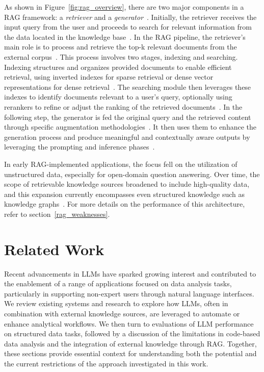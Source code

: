 \documentclass{DESSThesis}
\begin{document}
As shown in Figure~\ref{fig:rag_overview}, there are two major components in a RAG framework: a \emph{retriever} and a \emph{generator}~\cite{naveed2024comprehensiveoverviewlargelanguage,Yu_2025,zhao2024retrievalaugmentedgenerationaigeneratedcontent}. Initially, the retriever receives the input query from the user and proceeds to search for relevant information from the data located in the knowledge base~\cite{zhao2024retrievalaugmentedgenerationaigeneratedcontent}. In the RAG pipeline, the retriever's main role is to process and retrieve the top-k relevant
documents from the external corpus~\cite{gao2024retrievalaugmentedgenerationlargelanguage}. This process involves two stages, indexing and searching. Indexing structures and organizes provided documents to enable efficient retrieval, using inverted indexes for sparse retrieval or dense vector representations for dense retrieval~\cite{Yu_2025}. The searching module then leverages these indexes to identify documents relevant to a user's query, optionally using rerankers to refine or adjust the ranking of the retrieved documents~\cite{Yu_2025}. In the following step, the generator is fed the original query and the retrieved content through specific augmentation methodologies~\cite{zhao2024retrievalaugmentedgenerationaigeneratedcontent}. It then uses them to enhance the generation process and produce meaningful and contextually aware outputs by leveraging the prompting and inference phases~\cite{Yu_2025}.

In early RAG-implemented applications, the focus fell on the utilization of unstructured data, especially for open-domain question answering. Over time, the scope of retrievable knowledge sources broadened to include high-quality data, and this expansion currently encompasses even structured knowledge such as knowledge graphs~\cite{gao2024retrievalaugmentedgenerationlargelanguage}. For more details on the performance of this architecture, refer to section~\ref{rag_weaknesses}.

\chapter{Related Work} \label{chap:related_work}

Recent advancements in LLMs have sparked growing interest and contributed to the enablement of a range of applications focused on data analysis tasks, particularly in supporting non-expert users through natural language interfaces. We review existing systems and research to explore how LLMs, often in combination with external knowledge sources, are leveraged to automate or enhance analytical workflows. We then turn to evaluations of LLM performance on structured data tasks, followed by a discussion of the limitations in code-based data analysis and the integration of external knowledge through RAG. Together, these sections provide essential context for understanding both the potential and the current restrictions of the approach investigated in this work.
\end{document}
